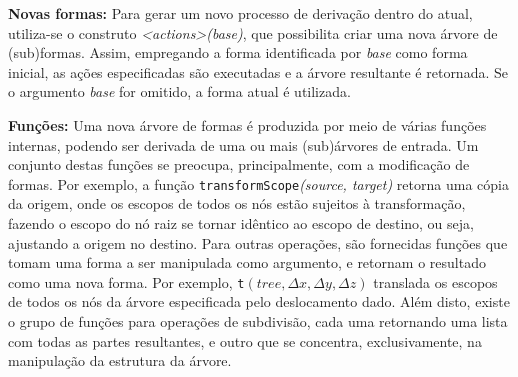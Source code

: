 \begin{figure}[h!]
	\centering
	\captionsetup{width=15cm}
	{}
\end{figure}

\textbf{Novas formas:} Para gerar um novo processo de derivação dentro do atual, utiliza-se o construto \textit{<actions>(base)}, que possibilita criar uma nova árvore de (sub)formas. Assim, empregando a forma identificada por \textit{base} como forma inicial, as ações especificadas são executadas e a árvore resultante é retornada. Se o argumento \textit{base} for omitido, a forma atual é utilizada.

\textbf{Funções:} Uma nova árvore de formas é produzida por meio de várias funções internas, podendo ser derivada de uma ou mais (sub)árvores de entrada. Um conjunto destas funções se preocupa, principalmente, com a modificação de formas. Por exemplo, a função \texttt{transformScope}\textit{(source, target)} retorna uma cópia da origem, onde os escopos de todos os nós estão sujeitos à transformação, fazendo o escopo do nó raiz se tornar idêntico ao escopo de destino, ou seja, ajustando a origem no destino. Para outras operações, são fornecidas funções que tomam uma forma a ser manipulada como argumento, e retornam o resultado como uma nova forma. Por exemplo, \texttt{t}$(tree, \Delta x, \Delta y, \Delta z)$ translada os escopos de todos os nós da árvore especificada pelo deslocamento dado. Além disto, existe o grupo de funções para operações de subdivisão, cada uma retornando uma lista com todas as partes resultantes, e outro que se concentra, exclusivamente, na manipulação da estrutura da árvore.

